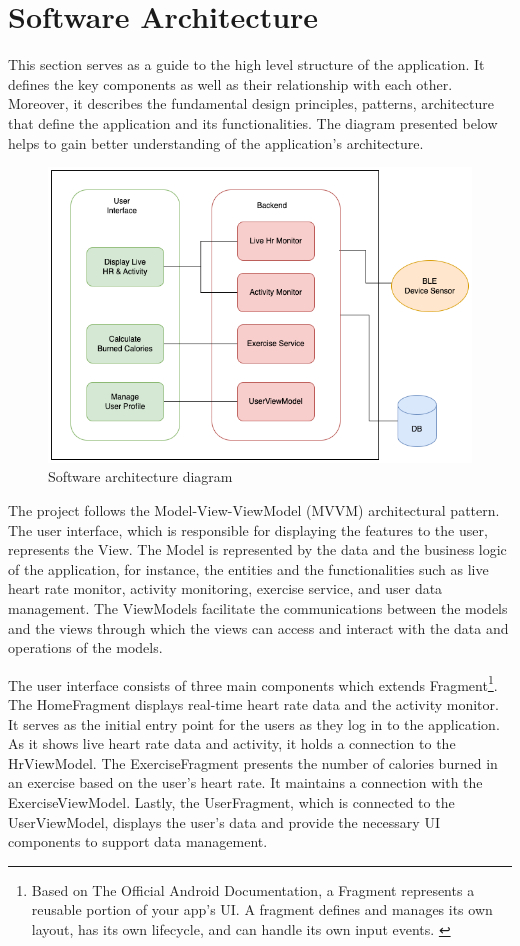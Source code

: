 \section{Software Architecture}
This section serves as a guide to the high level structure of the application. It defines the key components as well as their relationship with each other.
Moreover, it describes the fundamental design principles, patterns, architecture that define the application and its functionalities. 
The diagram presented below helps to gain better understanding of the application's architecture.
\begin{figure}[H]
    \centering
    \includegraphics[width=1\textwidth]{diagrams/architecture-diagram.drawio.png}
    \caption{Software architecture diagram}
    \label{fig:soft_diagram}
\end{figure}
The project follows the Model-View-ViewModel (MVVM) architectural pattern. The user interface, which is responsible for displaying the features to the user, represents the View. 
The Model is represented by the data and the business logic of the application, for instance, the entities and the functionalities such as live heart rate monitor, activity monitoring, exercise service, and user data management. 
The ViewModels facilitate the communications between the models and the views through which the views can access and interact with the data and operations of the models.

The user interface consists of three main components which extends Fragment\footnote{Based on The Official Android Documentation, a Fragment represents a reusable portion of your app's UI. A fragment defines and manages its own layout, has its own lifecycle, and can handle its own input events. \autocite{android-fragments}}. 
The HomeFragment displays real-time heart rate data and the activity monitor. It serves as the initial entry point for the users as they log in to the application. As it shows live heart rate data and activity, it holds a connection to the HrViewModel.
The ExerciseFragment presents the number of calories burned in an exercise based on the user's heart rate. It maintains a connection with the ExerciseViewModel. Lastly, the UserFragment, which is connected to the UserViewModel, displays the user's data and provide the necessary UI components to support data management.

